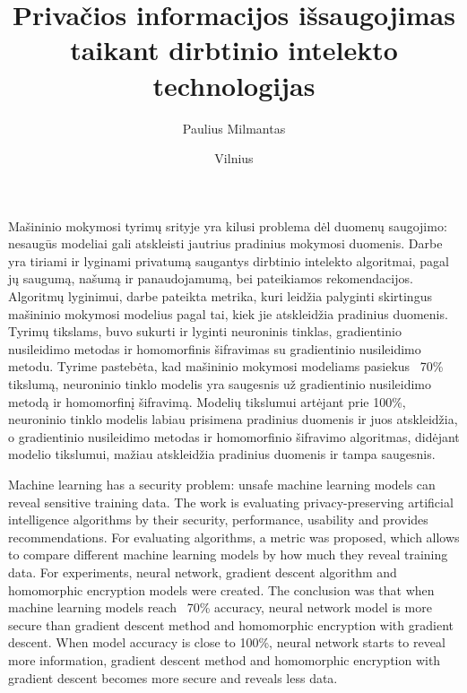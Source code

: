 \documentclass{VUMIFInfBakalaurinis}
\title{Privačios informacijos išsaugojimas taikant dirbtinio intelekto technologijas}
\author{Paulius Milmantas}
\date{Vilnius \\ \the\year}
\begin{document}
\maketitle

\pagestyle{empty} %
\tableofcontents
\pagestyle{fancy} %

Mašininio mokymosi tyrimų srityje yra kilusi problema dėl duomenų saugojimo: nesaugūs modeliai gali atskleisti jautrius pradinius mokymosi duomenis. Darbe yra tiriami ir lyginami privatumą saugantys dirbtinio intelekto algoritmai, pagal jų saugumą, našumą ir panaudojamumą, bei pateikiamos rekomendacijos. Algoritmų lyginimui, darbe pateikta metrika, kuri leidžia palyginti skirtingus mašininio mokymosi modelius pagal tai, kiek jie atskleidžia pradinius duomenis. Tyrimų tikslams, buvo sukurti ir lyginti  neuroninis tinklas, gradientinio nusileidimo metodas ir homomorfinis šifravimas su gradientinio nusileidimo metodu. Tyrime pastebėta, kad mašininio mokymosi modeliams pasiekus ~70\% tikslumą,  neuroninio tinklo modelis yra saugesnis už gradientinio nusileidimo metodą ir homomorfinį šifravimą. Modelių tikslumui artėjant prie 100\%,  neuroninio tinklo modelis labiau prisimena pradinius duomenis ir juos atskleidžia, o gradientinio nusileidimo metodas ir homomorfinio šifravimo algoritmas, didėjant modelio tikslumui, mažiau atskleidžia pradinius duomenis ir tampa saugesnis.


Machine learning has a security problem: unsafe machine learning models can reveal sensitive training data. The work is evaluating privacy-preserving artificial intelligence algorithms by their security, performance, usability and provides recommendations. For evaluating algorithms, a metric was proposed, which allows to compare different machine learning models by how much they reveal training data. For experiments,  neural network, gradient descent algorithm and homomorphic encryption models were created. The conclusion was that when machine learning models reach ~70\% accuracy,  neural network model is more secure than gradient descent method and homomorphic encryption with gradient descent. When model accuracy is close to 100\%,  neural network starts to reveal more information, gradient descent method and homomorphic encryption with gradient descent becomes more secure and reveals less data.
\end{document}
